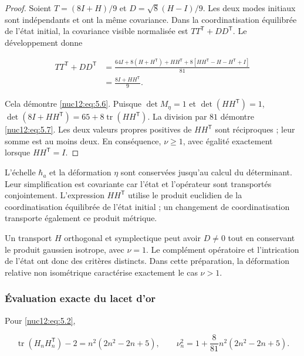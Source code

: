 \begin{proof}
Soient \(T=(8I+H)/9\) et \(D=\sqrt8(H-I)/9\). Les deux modes initiaux sont indépendants et ont la même covariance. Dans la coordinatisation équilibrée de l’état initial, la covariance visible normalisée est \(TT^{\mathsf T}+DD^{\mathsf T}\). Le développement donne



\[
\begin{aligned}
TT^{\mathsf T}+DD^{\mathsf T}
&=\frac{64I+8(H+H^{\mathsf T})+HH^{\mathsf T}
+8[HH^{\mathsf T}-H-H^{\mathsf T}+I]}{81}\\
&=\frac{8I+HH^{\mathsf T}}9.
\end{aligned}
\]



Cela démontre \eqref{nuc12:eq:5.6}. Puisque \(\det M_\eta=1\) et \(\det(HH^{\mathsf T})=1\),
\(\det(8I+HH^{\mathsf T})=65+8\operatorname{tr}(HH^{\mathsf T})\).
La division par \(81\) démontre \eqref{nuc12:eq:5.7}. Les deux valeurs propres positives de \(HH^{\mathsf T}\) sont réciproques ; leur somme est au moins deux. En conséquence, \(\nu\geq1\), avec égalité exactement lorsque \(HH^{\mathsf T}=I\).
\end{proof}

L’échelle \(\hbar_a\) et la déformation \(\eta\) sont conservées jusqu’au calcul du déterminant. Leur simplification est covariante car l’état et l’opérateur sont transportés conjointement. L’expression \(HH^{\mathsf T}\) utilise le produit euclidien de la coordinatisation équilibrée de l’état initial ; un changement de coordinatisation transporte également ce produit métrique.

Un transport \(H\) orthogonal et symplectique peut avoir \(D\neq0\) tout en conservant le produit gaussien isotrope, avec \(\nu=1\). Le complément opératoire et l’intrication de l’état ont donc des critères distincts. Dans cette préparation, la déformation relative non isométrique caractérise exactement le cas \(\nu>1\).

\subsubsection{Évaluation exacte du lacet d’or}

Pour \eqref{nuc12:eq:5.2},



\begin{equation}
\operatorname{tr}(H_nH_n^{\mathsf T})-2
=n^2(2n^2-2n+5),\qquad
\nu_n^2=1+\frac8{81}n^2(2n^2-2n+5).
\label{nuc12:eq:5.8}
\end{equation}



